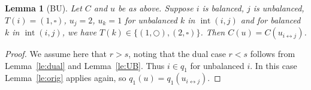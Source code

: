 \documentclass[reqno]{amsart}
\newcommand{\0}{\phantom{c}}
\DeclareMathOperator{\inter}{int} %
\theoremstyle{plain}
\newtheorem{lemma}[thm]{Lemma}
\theoremstyle{definition}
\numberwithin{equation}{section}
\begin{document}

\begin{lemma}[BU]
\label{le:BU}
  Let $C$ and $u$ be as above. Suppose $i$ is balanced, $j$ is unbalanced, $T(i) = (1,\square)$, $u_j = 2$, $u_k = 1$ for unbalanced $k$ in $\inter (i,j)$ and for balanced $k$ in $\inter(i,j)$, we have $T(k) \in \{(1,\bigcirc),(2,\square)\}$. Then $C(u) = C(u_{i \leftrightarrow j})$.
 \end{lemma} 
 
\begin{proof}
  We assume here that $r > s$, noting that the dual case $r < s$ follows from Lemma~\ref{le:dual} and Lemma~\ref{le:UB}. Thus $i \in q_1$ for unbalanced $i$. In this case Lemma~\ref{le:orig} applies again, so $q_1(u) = q_1(u_{i\leftrightarrow j})$.
\end{proof}
\end{document}
